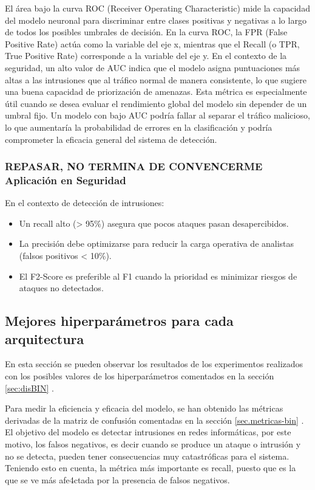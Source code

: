 \begin{itemize}
El área bajo la curva ROC (Receiver Operating Characteristic) mide la capacidad del modelo neuronal para discriminar entre clases positivas y negativas a lo largo de todos los posibles umbrales de decisión. 
En la curva ROC, la FPR (False Positive Rate) actúa como la variable del eje x, mientras que el Recall (o TPR, True Positive Rate) corresponde a la variable del eje y. En el contexto de la seguridad, un alto valor de AUC indica que el modelo asigna puntuaciones más altas a las intrusiones que al tráfico normal de manera consistente, lo que sugiere una buena capacidad de priorización de amenazas. Esta métrica es especialmente útil cuando se desea evaluar el rendimiento global del modelo sin depender de un umbral fijo. Un modelo con bajo AUC podría fallar al separar el tráfico malicioso, lo que aumentaría la probabilidad de errores en la clasificación y podría comprometer la eficacia general del sistema de detección.

\end{itemize}

\subsubsection{REPASAR, NO TERMINA DE CONVENCERME Aplicación en Seguridad}	\label{sec:apli-met-seg}
En el contexto de detección de intrusiones:
\begin{itemize}
    \item Un recall alto (> 95\%) asegura que pocos ataques pasan desapercibidos.
    \item La precisión debe optimizarse para reducir la carga operativa de analistas (falsos positivos < 10\%).
    \item El F2-Score es preferible al F1 cuando la prioridad es minimizar riesgos de ataques no detectados.
\end{itemize}


\subsection{Mejores hiperparámetros para cada arquitectura}
En esta sección se pueden observar los resultados de los experimentos realizados con los posibles valores de los hiperparámetros comentados en la sección \ref{sec:disBIN} .

Para medir la eficiencia y eficacia del modelo, se han obtenido las métricas derivadas de la matriz de confusión comentadas en la sección \ref{sec.metricas-bin} . El objetivo del modelo es detectar intrusiones en redes informáticas, por este motivo, los falsos negativos, es decir cuando se produce un ataque o intrusión y no se detecta, pueden tener consecuencias muy catastróficas para el sistema. Teniendo esto en cuenta, la métrica más importante es recall, puesto que es la que se ve más afe4ctada por la presencia de falsos negativos.

